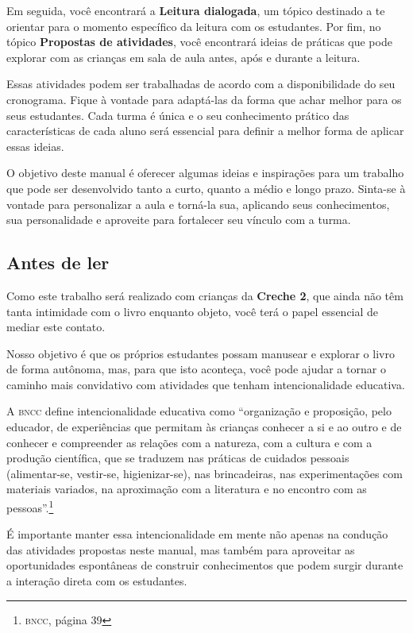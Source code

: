\documentclass[11pt]{extarticle}
\begin{document}
Em seguida, você encontrará a \textbf{Leitura dialogada}, um 
tópico destinado a te orientar para o momento específico da 
leitura com os estudantes. Por fim, no tópico 
\textbf{Propostas de atividades}, você encontrará ideias 
de práticas que pode explorar com as crianças em sala de 
aula antes, após e durante a leitura. 

Essas atividades podem ser trabalhadas de acordo com a 
disponibilidade do seu cronograma. Fique à vontade para adaptá-las 
da forma que achar melhor para os seus estudantes. Cada turma é única 
e o seu conhecimento prático das características de cada aluno será 
essencial para definir a melhor forma de aplicar essas ideias. 

O objetivo deste manual é oferecer algumas ideias 
e inspirações para um trabalho que pode ser desenvolvido tanto 
a curto, quanto a médio e longo prazo. Sinta-se à vontade para 
personalizar a aula e torná-la sua, aplicando seus conhecimentos, sua 
personalidade e aproveite para fortalecer 
seu vínculo com a turma.


\subsection{Antes de ler}


Como este trabalho será realizado com crianças da \textbf{Creche 2}, 
que ainda não têm tanta intimidade com o livro enquanto objeto, você terá o 
papel essencial de mediar este contato. 

Nosso objetivo é que os próprios estudantes possam manusear 
e explorar o livro de forma autônoma, mas, para que isto aconteça, você 
pode ajudar a tornar o caminho mais convidativo com atividades que tenham 
intencionalidade educativa. 

A \textsc{bncc} define intencionalidade educativa como ``organização 
e proposição, pelo educador, de experiências que permitam às crianças 
conhecer a si e ao outro e de conhecer e compreender as relações com a 
natureza, com a cultura e com a produção científica, que se traduzem nas 
práticas de cuidados pessoais (alimentar-se, vestir-se, higienizar-se), 
nas brincadeiras, nas experimentações com materiais 
variados, na aproximação com a literatura e no encontro com as 
pessoas''.\footnote{\textsc{bncc}, página 39}

É importante manter essa intencionalidade em mente não apenas na condução 
das atividades propostas neste manual, mas também para aproveitar as 
oportunidades espontâneas de construir conhecimentos que podem surgir durante 
a interação direta com os estudantes.
\end{document}
